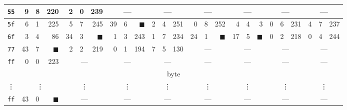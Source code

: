 \begin{tabular}{| c | r@{.} l@{\quad}r | r@{.} l@{\quad}r | r@{.} l@{\quad}r | r@{.} l@{\quad}r | r@{.} l@{\quad}r | r@{.} l@{\quad}r | r@{.} l@{\quad}r | r@{.} l@{\quad}r |}
	\hline
	{\tt 55}&9&8&220&2&0&239&\multicolumn{3}{c|}{---}&\multicolumn{3}{c|}{---}&\multicolumn{3}{c|}{---}&\multicolumn{3}{c|}{---}&\multicolumn{3}{c|}{---}&\multicolumn{3}{c|}{---}\\
	\hline
	{\tt 5f}&6&1&225&5&7&245&39&6&$\blacksquare$&2&4&251&0&8&252&4&4&3&0&6&231&4&7&237\\
	\hline
	{\tt 6f}&3&4&86&34&3&$\blacksquare$&1&3&243&1&7&234&24&1&$\blacksquare$&17&5&$\blacksquare$&0&2&218&0&4&244\\
	\hline
	{\tt 77}&43&7&$\blacksquare$&2&2&219&0&1&194&7&5&130&\multicolumn{3}{c|}{---}&\multicolumn{3}{c|}{---}&\multicolumn{3}{c|}{---}&\multicolumn{3}{c|}{---}\\
	\hline
	{\tt ff}&0&0&223&\multicolumn{3}{c|}{---}&\multicolumn{3}{c|}{---}&\multicolumn{3}{c|}{---}&\multicolumn{3}{c|}{---}&\multicolumn{3}{c|}{---}&\multicolumn{3}{c|}{---}&\multicolumn{3}{c|}{---}\\
	\hline
	\hline
	\multicolumn{25}{|c|}{\nth{3} byte} \\
	\hline
	\vdots & \multicolumn{3}{c|}{\vdots} & \multicolumn{3}{c|}{\vdots} & \multicolumn{3}{c|}{\vdots} & \multicolumn{3}{c|}{\vdots} & \multicolumn{3}{c|}{\vdots} & \multicolumn{3}{c|}{\vdots} & \multicolumn{3}{c|}{\vdots} & \multicolumn{3}{c|}{\vdots} \\
	\hline
	{\tt ff}&43&0&$\blacksquare$&\multicolumn{3}{c|}{---}&\multicolumn{3}{c|}{---}&\multicolumn{3}{c|}{---}&\multicolumn{3}{c|}{---}&\multicolumn{3}{c|}{---}&\multicolumn{3}{c|}{---}&\multicolumn{3}{c|}{---}\\
	\hline
\end{tabular}